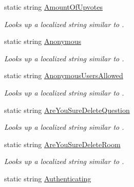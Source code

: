 \begin{DoxyCompactItemize}
static string \hyperlink{class_wis_r_1_1_app___resources_1_1_resource_a96a3b9a768f7b39309bdb0a48070cbc1}{Amount\+Of\+Upvotes}
\begin{DoxyCompactList}\small\item\em Looks up a localized string similar to . \end{DoxyCompactList}\item 
static string \hyperlink{class_wis_r_1_1_app___resources_1_1_resource_a025ff50e5baac7d2552691e8c3147f42}{Anonymous}
\begin{DoxyCompactList}\small\item\em Looks up a localized string similar to . \end{DoxyCompactList}\item 
static string \hyperlink{class_wis_r_1_1_app___resources_1_1_resource_aaa9816677e2ef2cbafb3eeb8e0c3bb54}{Anonymous\+Users\+Allowed}
\begin{DoxyCompactList}\small\item\em Looks up a localized string similar to . \end{DoxyCompactList}\item 
static string \hyperlink{class_wis_r_1_1_app___resources_1_1_resource_a4e7a5eb3ad48818ea2b9e2d1099569f8}{Are\+You\+Sure\+Delete\+Question}
\begin{DoxyCompactList}\small\item\em Looks up a localized string similar to . \end{DoxyCompactList}\item 
static string \hyperlink{class_wis_r_1_1_app___resources_1_1_resource_a6857c8d50b27b5a5f44f1e8469e3fa26}{Are\+You\+Sure\+Delete\+Room}
\begin{DoxyCompactList}\small\item\em Looks up a localized string similar to . \end{DoxyCompactList}\item 
static string \hyperlink{class_wis_r_1_1_app___resources_1_1_resource_a54de9b4fe27e3764e96f39054b35213b}{Authenticating}

\end{DoxyCompactItemize}
